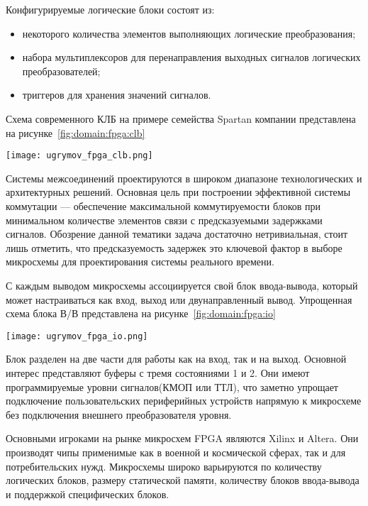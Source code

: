 Конфигурируемые логические блоки состоят из:
\begin{itemize}
  \item некоторого количества элементов выполняющих логические преобразования;
  \item набора мультиплексоров для перенаправления выходных сигналов логических преобразователей;
  \item триггеров для хранения значений сигналов.
\end{itemize}

Схема современного КЛБ на примере семейства Spartan компании  представлена на рисунке~\ref{fig:domain:fpga:clb}

\begin{center}
  \centering
  \texttt{[image: ugrymov\_fpga\_clb.png]}
  \label{fig:domain:fpga:clb}
\end{center}

Системы межсоединений проектируются в широком диапазоне технологических и архитектурных решений.
Основная цель при построении эффективной системы коммутации --- обеспечение максимальной коммутируемости блоков
при минимальном количестве элементов связи с предсказуемыми задержками сигналов. Обозрение данной тематики задача достаточно нетривиальная,
стоит лишь отметить, что предсказуемость задержек это ключевой фактор в выборе микросхемы для проектирования системы реального времени.

С каждым выводом микросхемы ассоциируется свой блок ввода-вывода, который может настраиваться как вход, выход или двунаправленный вывод.
Упрощенная схема блока В/В представлена на рисунке~\ref{fig:domain:fpga:io}

\begin{center}
  \centering
  \texttt{[image: ugrymov\_fpga\_io.png]}
  \label{fig:domain:fpga:io}
\end{center}

Блок разделен на две части для работы как на вход, так и на выход. Основной интерес представляют буферы с тремя состояниями
1 и 2. Они имеют программируемые уровни сигналов(КМОП или ТТЛ), что заметно упрощает подключение пользовательских периферийных устройств
напрямую к микросхеме без подключения внешнего преобразователя уровня.

Основными игроками на рынке микросхем FPGA являются Xilinx и Altera. Они производят чипы применимые как в военной и космической сферах,
так и для потребительских нужд. Микросхемы широко варьируются по количеству логических блоков, размеру
статической памяти, количеству блоков ввода-вывода и поддержкой специфических блоков.

